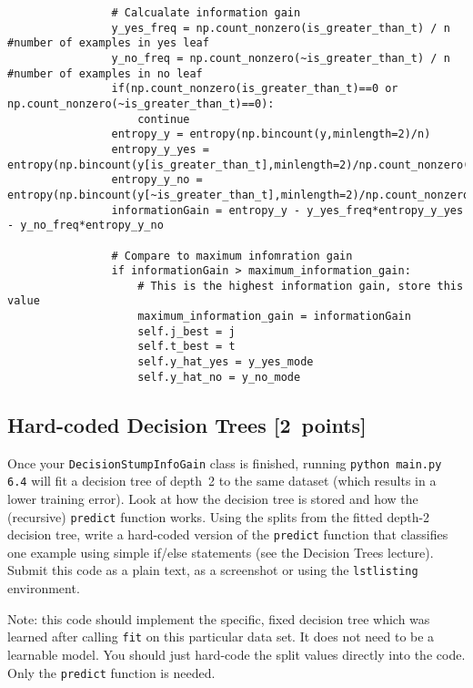 \documentclass{article}
\newcommand{\blu}[1]{{\textcolor{blu}{#1}}}
\let\ask\blu
\newcommand\pts[1]{\textcolor{pointscolour}{[#1~points]}}
\begin{document}
\begin{verbatim}
                # Calcualate information gain
                y_yes_freq = np.count_nonzero(is_greater_than_t) / n #number of examples in yes leaf
                y_no_freq = np.count_nonzero(~is_greater_than_t) / n #number of examples in no leaf
                if(np.count_nonzero(is_greater_than_t)==0 or np.count_nonzero(~is_greater_than_t)==0):
                    continue
                entropy_y = entropy(np.bincount(y,minlength=2)/n) 
                entropy_y_yes = entropy(np.bincount(y[is_greater_than_t],minlength=2)/np.count_nonzero(is_greater_than_t))
                entropy_y_no = entropy(np.bincount(y[~is_greater_than_t],minlength=2)/np.count_nonzero(~is_greater_than_t))
                informationGain = entropy_y - y_yes_freq*entropy_y_yes - y_no_freq*entropy_y_no

                # Compare to maximum infomration gain
                if informationGain > maximum_information_gain:
                    # This is the highest information gain, store this value
                    maximum_information_gain = informationGain
                    self.j_best = j
                    self.t_best = t
                    self.y_hat_yes = y_yes_mode
                    self.y_hat_no = y_no_mode

\end{verbatim}
\newpage

  \subsection{Hard-coded Decision Trees \pts{2}}

  Once your \texttt{DecisionStumpInfoGain} class is finished, running \texttt{python main.py 6.4} will fit
  a decision tree of depth~2 to the same dataset (which results in a lower training error).
  Look at how the decision tree is stored and how the (recursive) \texttt{predict} function works.
  \ask{Using the splits from the fitted depth-2 decision tree, write a hard-coded version of the \texttt{predict}
  function that classifies one example using simple if/else statements
  (see the Decision Trees lecture). Submit this code as a plain text, as a screenshot or using the \texttt{lstlisting} environment.}

  Note: this code should implement the specific, fixed decision tree
  which was learned after calling \texttt{fit} on this particular data set. It does not need to be a learnable model.
  You should just hard-code the split values directly into the code.
  Only the \texttt{predict} function is needed.
\end{document}
